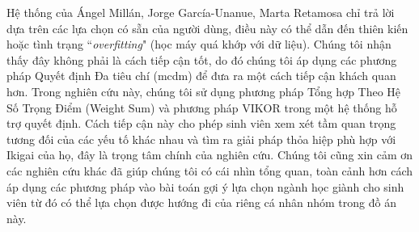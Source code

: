 Hệ thống của Ángel Millán, Jorge García-Unanue, Marta Retamosa chỉ trả lời dựa trên các lựa chọn có sẵn của người dùng, điều này có thể dẫn đến thiên kiến hoặc tình trạng ``\textit{overfitting}" (học máy quá khớp với dữ liệu). Chúng tôi nhận thấy đây không phải là cách tiếp cận tốt, do đó chúng tôi áp dụng các phương pháp Quyết định Đa tiêu chí (\acrfull{mcdm}) để đưa ra một cách tiếp cận khách quan hơn. Trong nghiên cứu này, chúng tôi sử dụng phương pháp Tổng hợp Theo Hệ Số Trọng Điểm (Weight Sum) và phương pháp VIKOR trong một hệ thống hỗ trợ quyết định. Cách tiếp cận này cho phép sinh viên xem xét tầm quan trọng tương đối của các yếu tố khác nhau và tìm ra giải pháp thỏa hiệp phù hợp với Ikigai của họ, đây là trọng tâm chính của nghiên cứu. Chúng tôi cũng xin cảm ơn các nghiên cứu khác đã giúp chúng tôi có cái nhìn tổng quan, toàn cảnh hơn cách áp dụng các phương pháp vào bài toán gợi ý lựa chọn ngành học giành cho sinh viên từ đó có thể lựa chọn được hướng đi của riêng cá nhân nhóm trong đồ án này.